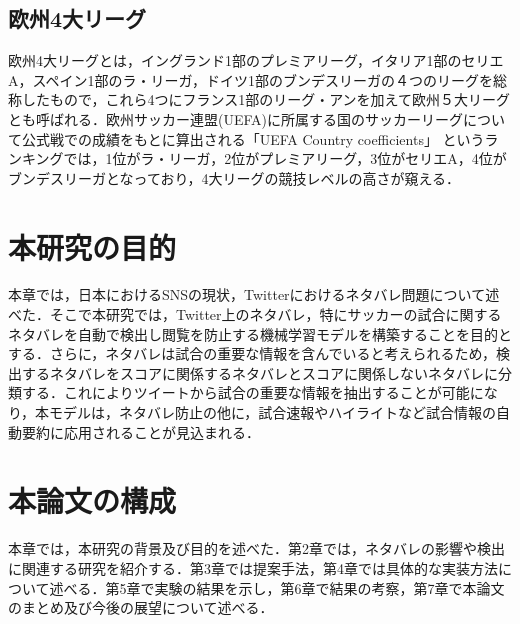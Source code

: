 \subsection{欧州4大リーグ}
欧州4大リーグとは，イングランド1部のプレミアリーグ，イタリア1部のセリエA，スペイン1部のラ・リーガ，ドイツ1部のブンデスリーガの４つのリーグを総称したもので，これら4つにフランス1部のリーグ・アンを加えて欧州５大リーグとも呼ばれる．欧州サッカー連盟(UEFA)に所属する国のサッカーリーグについて公式戦での成績をもとに算出される「UEFA Country coefficients」 \cite{UEFA}というランキングでは，1位がラ・リーガ，2位がプレミアリーグ，3位がセリエA，4位がブンデスリーガとなっており，4大リーグの競技レベルの高さが窺える．

\section{本研究の目的}
本章では，日本におけるSNSの現状，Twitterにおけるネタバレ問題について述べた．そこで本研究では，Twitter上のネタバレ，特にサッカーの試合に関するネタバレを自動で検出し閲覧を防止する機械学習モデルを構築することを目的とする．さらに，ネタバレは試合の重要な情報を含んでいると考えられるため，検出するネタバレをスコアに関係するネタバレとスコアに関係しないネタバレに分類する．これによりツイートから試合の重要な情報を抽出することが可能になり，本モデルは，ネタバレ防止の他に，試合速報やハイライトなど試合情報の自動要約に応用されることが見込まれる．

\section{本論文の構成}
本章では，本研究の背景及び目的を述べた．第2章では，ネタバレの影響や検出に関連する研究を紹介する．第3章では提案手法，第4章では具体的な実装方法について述べる．第5章で実験の結果を示し，第6章で結果の考察，第7章で本論文のまとめ及び今後の展望について述べる．


